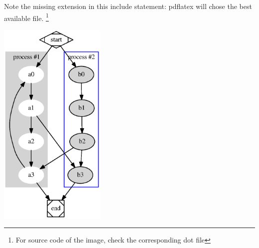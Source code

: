 Note the missing extension in this include statement: pdflatex will chose the best available file. \footnote{For source code of the image, check the corresponding dot file}

\includegraphics[height=10cm]{graph01/cluster}
